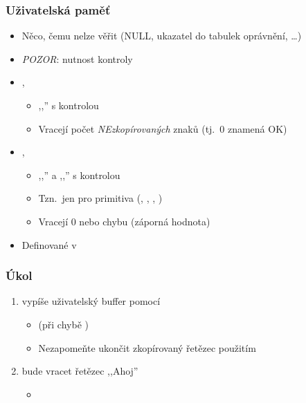 \begin{frame}
  \frametitle{Uživatelská paměť}

  \begin{itemize}
    \item Něco, čemu nelze věřit (NULL, ukazatel do tabulek oprávnění, \dots)
    \item \emph{POZOR}: nutnost kontroly

    \pause

    \item {}, 
    \begin{itemize}
      \item ,,'' s kontrolou
      \item Vracejí počet \emph{NEzkopírovaných} znaků (tj.\ 0 znamená OK)
    \end{itemize}

    \pause

    \item {}, 
    \begin{itemize}
      \item ,,'' a ,,'' s kontrolou
      \item Tzn.\ jen pro primitiva (, , ,
	)
      \item Vracejí 0 nebo chybu (záporná hodnota)
    \end{itemize}

    \item Definované v 
  \end{itemize}

  \pause

   

\end{frame}

\begin{frame}
  \frametitle{Úkol}


  \begin{enumerate}

  \item {} vypíše uživatelský buffer pomocí 
  \begin{itemize}
    \item {} (při chybě )
    \item Nezapomeňte ukončit zkopírovaný řetězec použitím 
  \end{itemize}

  \item {} bude vracet řetězec ,,Ahoj''
  \begin{itemize}
    \item {}
  \end{itemize}

  \end{enumerate}

\end{frame}

